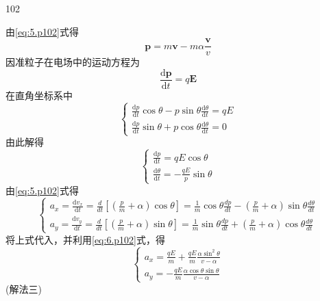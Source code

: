 \begin{solution}{102}
\begin{subsolution}
        由\eqref{eq:5.p102}式得
        \begin{equation*}
            \boldsymbol {p} = m \boldsymbol {v} - m \alpha \frac {\boldsymbol {v}}{v}
        \end{equation*}
        因准粒子在电场中的运动方程为
        \begin{equation*}
            \frac {\mathrm{d} \boldsymbol {p}}{\mathrm{d} t} = q \boldsymbol {E}
        \end{equation*}
        在直角坐标系中
        \begin{equation*}
            \left\{ \begin{array}{l} \frac {\mathrm{d} p}{\mathrm{d} t} \cos \theta - p \sin \theta \frac {\mathrm{d} \theta}{\mathrm{d} t} = q E \\ \frac {\mathrm{d} p}{\mathrm{d} t} \sin \theta + p \cos \theta \frac {\mathrm{d} \theta}{\mathrm{d} t} = 0 \end{array} \right.
        \end{equation*}
        由此解得
        \begin{equation*}
            \left\{ \begin{array}{l} \frac {\mathrm{d} p}{\mathrm{d} t} = q E \cos \theta \\ \frac {\mathrm{d} \theta}{\mathrm{d} t} = - \frac {q E}{p} \sin \theta \end{array} \right.
        \end{equation*}
        由\eqref{eq:5.p102}式得
        \begin{equation*}
            \left\{ \begin{array}{l} a _ {x} = \frac {\mathrm{d} v _ {x}}{\mathrm{d} t} = \frac {d}{d t} \left[ \left(\frac {p}{m} + \alpha\right) \cos \theta \right] = \frac {1}{m} \cos \theta \frac {d p}{d t} - \left(\frac {p}{m} + \alpha\right) \sin \theta \frac {d \theta}{d t} \\ a _ {y} = \frac {\mathrm{d} v _ {y}}{\mathrm{d} t} = \frac {d}{d t} \left[ \left(\frac {p}{m} + \alpha\right) \sin \theta \right] = \frac {1}{m} \sin \theta \frac {d p}{d t} + \left(\frac {p}{m} + \alpha\right) \cos \theta \frac {d \theta}{d t} \end{array} \right.
        \end{equation*}
        将上式代入，并利用\eqref{eq:6.p102}式，得
        \begin{equation*}
            \left\{ \begin{array}{l} a _ {x} = \frac {q E}{m} + \frac {q E}{m} \frac {\alpha \sin^ {2} \theta}{v - \alpha} \\ a _ {y} = - \frac {q E}{m} \frac {\alpha \cos \theta \sin \theta}{v - \alpha} \end{array} \right.
        \end{equation*}
        (解法三)


\end{subsolution}
\end{solution}
